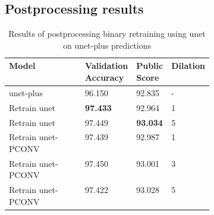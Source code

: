  
\subsection{Postprocessing results}
 
\begin{table}[H]
    \centering
    \begin{tabular}{l|p{0.15\linewidth}|p{0.15\linewidth}|p{0.10\linewidth}}
        Model & Validation Accuracy & Public Score & Dilation\\ \hline
        \acrshort{unet}-plus &  96.150 & 92.835 & -\\\hline %
        Retrain \acrshort{unet} & \textbf{97.433} & 92.964 & 1\\ %
        Retrain \acrshort{unet}  &  97.449 & \textbf{93.034} & 5\\ %
        \hline
        Retrain \acrshort{unet}-PCONV & 97.439 & 92.987 & 1\\ %
        Retrain \acrshort{unet}-PCONV & 97.450 & 93.001 & 3\\ %
        Retrain \acrshort{unet}-PCONV & 97.422 & 93.028 & 5\\ %
    \end{tabular}
    \caption{Results of postprocessing binary retraining using \acrshort{unet} on \acrshort{unet}-plus predictions}
    \label{tab:postprocessingunet}
\end{table}
 

